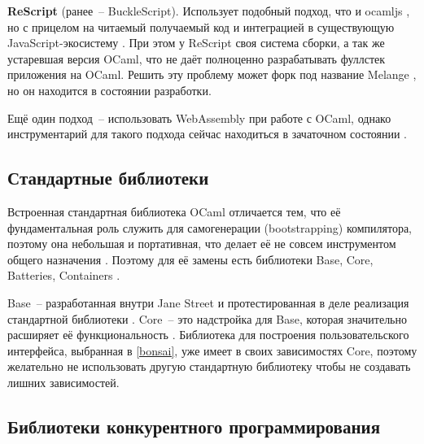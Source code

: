 \textbf{ReScript} (ранее~-- BuckleScript). Использует подобный подход, что и ocamljs \cite{bobzhang-rawlambda},
но с прицелом на читаемый получаемый код и интеграцией в существующую JavaScript-экосистему \cite{rescript-introduction}.
При этом у ReScript своя система сборки, а так же устаревшая версия OCaml, что не даёт полноценно
разрабатывать фуллстек приложения на OCaml. Решить эту проблему может форк под название Melange \cite{melange},
но он находится в состоянии разработки.

Ещё один подход~-- использовать WebAssembly при работе с OCaml, однако
инструментарий для такого подхода сейчас находиться в зачаточном состоянии \TODO.

\subsection{Стандартные библиотеки}

Встроенная стандартная библиотека OCaml отличается тем, что её фундаментальная роль
служить для самогенерации (bootstrapping) компилятора, поэтому она небольшая и портативная,
что делает её не совсем инструментом общего назначения \cite{rwo-prologue}.
Поэтому для её замены есть библиотеки Base, Core, Batteries, Containers \cite{ocamlverse-libraries}.

Base~-- разработанная внутри Jane Street и протестированная в деле реализация стандартной библиотеки \cite{ocamlverse-libraries}.
Core~-- это надстройка для Base, которая значительно расширяет её функциональность \cite{janestreet-opensource}.
Библиотека для построения пользовательского интерфейса, выбранная в \ref{bonsai}, уже имеет в своих зависимостях Core,
поэтому желательно не использовать другую стандартную библиотеку чтобы не создавать лишних зависимостей.

\subsection{Библиотеки конкурентного программирования}

